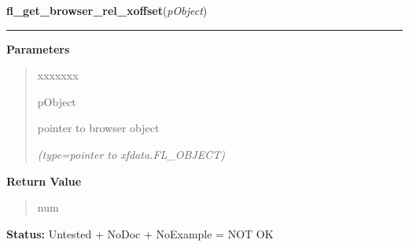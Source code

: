 \hspace{.8\funcindent}\begin{boxedminipage}{\funcwidth}

    \raggedright \textbf{fl\_get\_browser\_rel\_xoffset}(\textit{pObject})

    \vspace{-1.5ex}

    \rule{\textwidth}{0.5\fboxrule}
\setlength{\parskip}{2ex}
\setlength{\parskip}{1ex}
      \textbf{Parameters}
      \vspace{-1ex}

      \begin{quote}
        \begin{Ventry}{xxxxxxx}

          \item[pObject]

          pointer to browser object

            {\it (type=pointer to xfdata.FL\_OBJECT)}

        \end{Ventry}

      \end{quote}

      \textbf{Return Value}
    \vspace{-1ex}

      \begin{quote}
      num

      \end{quote}

\textbf{Status:} Untested + NoDoc + NoExample = NOT OK



    \end{boxedminipage}

    \label{xformslib:library:fl_set_browser_xoffset}

    \vspace{0.5ex}

